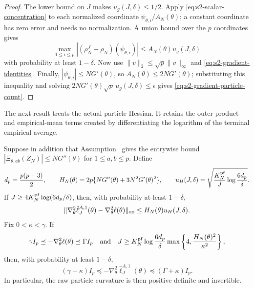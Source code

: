 \begin{proof}
The lower bound on $J$ makes $u_g(J,\delta)\leq1/2$.  Apply
\eqref{eq:s2-scalar-concentration} to each normalized coordinate
$\psi_{\theta,i}/A_N(\theta)$; a constant coordinate has zero error and needs
no normalization.  A union bound over the $p$ coordinates gives
\begin{equation*}
\max_{1\leq i\leq p}
 |(\rho_N^J-\rho_N)(\psi_{\theta,i})|
 \leq A_N(\theta)u_g(J,\delta)
\end{equation*}
with probability at least $1-\delta$.  Now use
$\|v\|_2\leq\sqrt p\|v\|_\infty$ and
\eqref{eq:s2-gradient-identities}.  Finally,
$|\psi_{\theta,i}|\leq NG'(\theta)$, so
$A_N(\theta)\leq2NG'(\theta)$; substituting this inequality and solving
$2NG'(\theta)\sqrt p\,u_g(J,\delta)\leq\epsilon$ gives
\eqref{eq:s2-gradient-particle-count}.
\end{proof}

The next result treats the actual particle Hessian.  It retains the
outer-product and empirical-mean terms created by differentiating the logarithm
of the terminal empirical average.

\begin{lem}[Explicit concentration of the \aigen{Algorithm~\ref{alg:dmop} ($\alpha=1$)} particle Hessian]
\label{lemma:hess_bound}
Suppose in addition that Assumption~{} gives the
entrywise bound
\(
|\Xi_{\theta,ab}(Z_N)|\leq NG''(\theta)
\)
for $1\leq a,b\leq p$.  Define
\begin{equation}
d_p=\frac{p(p+3)}2,\qquad
H_N(\theta)=2p\{NG''(\theta)+3N^2G'(\theta)^2\},\qquad
u_H(J,\delta)=
 \sqrt{\frac{K_N^{\rm pf}}{J}\log\frac{6d_p}{\delta}}.         \label{eq:s2-hessian-constants}
\end{equation}
If $J\geq4K_N^{\rm pf}\log(6d_p/\delta)$, then, with probability at least
$1-\delta$,
\begin{equation}
\|\nabla_\theta^2\hat\ell_J^{A,1}(\theta)
      -\nabla_\theta^2\ell(\theta)\|_{\rm op}
\leq H_N(\theta)u_H(J,\delta).                                 \label{eq:s2-hessian-concentration}
\end{equation}
Fix $0<\kappa<\gamma$.  If
\begin{equation}
\gamma I_p\preceq-\nabla_\theta^2\ell(\theta)\preceq\Gamma I_p
\quad\hbox{and}\quad
J\geq K_N^{\rm pf}\log\frac{6d_p}{\delta}
 \max\left\{4,\frac{H_N(\theta)^2}{\kappa^2}\right\},       \label{eq:s2-hessian-particle-count}
\end{equation}
then, with probability at least $1-\delta$,
\begin{equation}
(\gamma-\kappa)I_p
 \preceq-\nabla_\theta^2\hat\ell_J^{A,1}(\theta)
 \preceq(\Gamma+\kappa)I_p.                                  \label{eq:s2-hessian-eigenvalues}
\end{equation}
In particular, the raw particle curvature is then positive definite and
invertible.
\end{lem}

